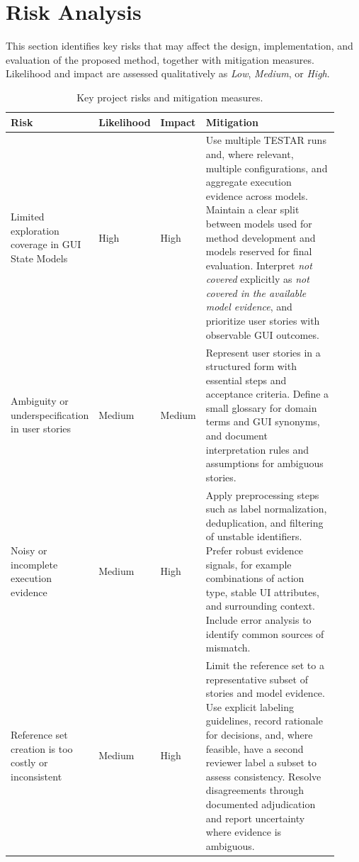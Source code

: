 \section{Risk Analysis}
\label{sec:risk-analysis}

This section identifies key risks that may affect the design, implementation, and evaluation of the proposed method, together with mitigation measures. Likelihood and impact are assessed qualitatively as \emph{Low}, \emph{Medium}, or \emph{High}.

\begin{table}[h!tb]
\centering
\caption{Key project risks and mitigation measures.}
\label{tab:risks}
\begin{tabular}{p{0.20\linewidth} p{0.12\linewidth} p{0.12\linewidth} p{0.48\linewidth}}
\toprule
\textbf{Risk} & \textbf{Likelihood} & \textbf{Impact} & \textbf{Mitigation} \\
\midrule

Limited exploration coverage in GUI State Models &
High & High &
Use multiple TESTAR runs and, where relevant, multiple configurations, and aggregate execution evidence across models. Maintain a clear split between models used for method development and models reserved for final evaluation. Interpret \emph{not covered} explicitly as \emph{not covered in the available model evidence}, and prioritize user stories with observable GUI outcomes. \\

Ambiguity or underspecification in user stories &
Medium & Medium &
Represent user stories in a structured form with essential steps and acceptance criteria. Define a small glossary for domain terms and GUI synonyms, and document interpretation rules and assumptions for ambiguous stories. \\

Noisy or incomplete execution evidence &
Medium & High &
Apply preprocessing steps such as label normalization, deduplication, and filtering of unstable identifiers. Prefer robust evidence signals, for example combinations of action type, stable UI attributes, and surrounding context. Include error analysis to identify common sources of mismatch. \\

Reference set creation is too costly or inconsistent &
Medium & High &
Limit the reference set to a representative subset of stories and model evidence. Use explicit labeling guidelines, record rationale for decisions, and, where feasible, have a second reviewer label a subset to assess consistency. Resolve disagreements through documented adjudication and report uncertainty where evidence is ambiguous. \\


\end{tabular}
\end{table}
